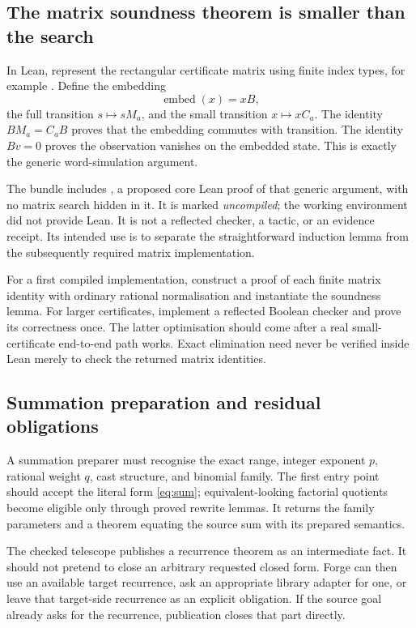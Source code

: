 \subsection{The matrix soundness theorem is smaller than the search}

In Lean, represent the rectangular certificate matrix using finite index types,
for example . Define the embedding
\[
\operatorname{embed}(x)=xB,
\]
the full transition $s\mapsto sM_a$, and the small transition $x\mapsto xC_a$.
The identity $BM_a=C_aB$ proves that the embedding commutes with transition.
The identity $Bv=0$ proves the observation vanishes on the embedded state.
This is exactly the generic word-simulation argument.

The bundle includes , a proposed core Lean proof
of that generic argument, with no matrix search hidden in it. It is marked
\emph{uncompiled}; the working environment did not provide Lean. It is not a
reflected checker, a tactic, or an evidence receipt. Its intended use is to
separate the straightforward induction lemma from the subsequently required
matrix implementation.

For a first compiled implementation, construct a proof of each finite matrix
identity with ordinary rational normalisation and instantiate the soundness
lemma. For larger certificates, implement a reflected Boolean checker and
prove its correctness once. The latter optimisation should come after a real
small-certificate end-to-end path works. Exact elimination need never be
verified inside Lean merely to check the returned matrix identities.

\subsection{Summation preparation and residual obligations}

A summation preparer must recognise the exact range, integer exponent $p$,
rational weight $q$, cast structure, and binomial family. The first entry point
should accept the literal form \eqref{eq:sum}; equivalent-looking factorial
quotients become eligible only through proved rewrite lemmas. It returns the
family parameters and a theorem equating the source sum with its prepared
semantics.

The checked telescope publishes a recurrence theorem as an intermediate fact.
It should not pretend to close an arbitrary requested closed form. Forge can
then use an available target recurrence, ask an appropriate library adapter for
one, or leave that target-side recurrence as an explicit obligation. If the
source goal already asks for the recurrence, publication closes that part
directly.

